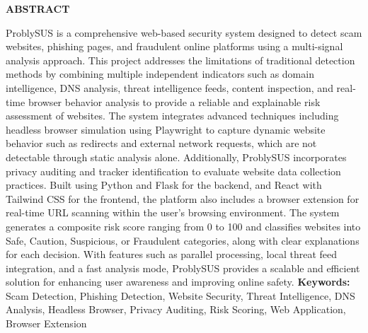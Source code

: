 \clearpage
\thispagestyle{footeronly}
{}
\begin{center}
{\Large \textbf{ABSTRACT}}
\end{center}
\justifying
\noindent
ProblySUS is a comprehensive web-based security system designed to detect scam websites, phishing pages, and fraudulent online platforms using a multi-signal analysis approach. This project addresses the limitations of traditional detection methods by combining multiple independent indicators such as domain intelligence, DNS analysis, threat intelligence feeds, content inspection, and real-time browser behavior analysis to provide a reliable and explainable risk assessment of websites.
\noindent
The system integrates advanced techniques including headless browser simulation using Playwright to capture dynamic website behavior such as redirects and external network requests, which are not detectable through static analysis alone. Additionally, ProblySUS incorporates privacy auditing and tracker identification to evaluate website data collection practices. Built using Python and Flask for the backend, and React with Tailwind CSS for the frontend, the platform also includes a browser extension for real-time URL scanning within the user's browsing environment.
\noindent
The system generates a composite risk score ranging from 0 to 100 and classifies websites into Safe, Caution, Suspicious, or Fraudulent categories, along with clear explanations for each decision. With features such as parallel processing, local threat feed integration, and a fast analysis mode, ProblySUS provides a scalable and efficient solution for enhancing user awareness and improving online safety.
\noindent
\textbf{Keywords:} Scam Detection, Phishing Detection, Website Security, Threat Intelligence, DNS Analysis, Headless Browser, Privacy Auditing, Risk Scoring, Web Application, Browser Extension
\vfill

\clearpage